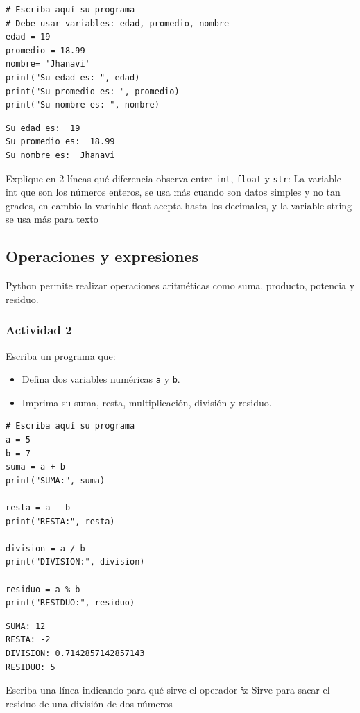 \documentclass{article}
\begin{document}
\begin{verbatim}
# Escriba aquí su programa
# Debe usar variables: edad, promedio, nombre
edad = 19
promedio = 18.99
nombre= 'Jhanavi'
print("Su edad es: ", edad)
print("Su promedio es: ", promedio)
print("Su nombre es: ", nombre)
\end{verbatim}

\begin{verbatim}
Su edad es:  19
Su promedio es:  18.99
Su nombre es:  Jhanavi
\end{verbatim}


Explique en 2 líneas qué diferencia observa entre \texttt{int}, \texttt{float} y \texttt{str}:
La variable int que son los números enteros, se usa más cuando son datos simples
y no tan grades, en cambio la variable float acepta hasta los decimales, y la variable string se usa más para texto

\subsection{Operaciones y expresiones}
\label{sec:org205012c}
Python permite realizar operaciones aritméticas como suma, producto, potencia y residuo.

\subsubsection{Actividad 2}
\label{sec:orga588a35}
Escriba un programa que:
\begin{itemize}
\item Defina dos variables numéricas \texttt{a} y \texttt{b}.
\item Imprima su suma, resta, multiplicación, división y residuo.
\end{itemize}

\begin{verbatim}
# Escriba aquí su programa
a = 5
b = 7
suma = a + b
print("SUMA:", suma)

resta = a - b
print("RESTA:", resta)

division = a / b
print("DIVISION:", division)

residuo = a % b
print("RESIDUO:", residuo)
\end{verbatim}

\begin{verbatim}
SUMA: 12
RESTA: -2
DIVISION: 0.7142857142857143
RESIDUO: 5
\end{verbatim}


Escriba una línea indicando para qué sirve el operador \texttt{\%}: Sirve para sacar el residuo de una división de dos números 
\end{document}
